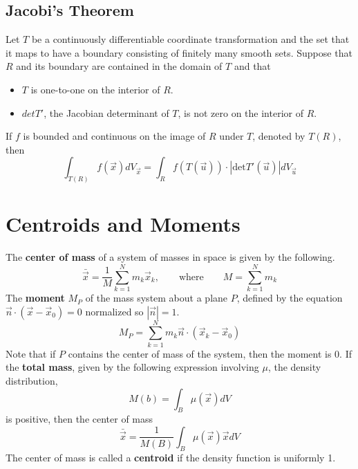 \documentclass[11pt]{article}
\begin{document}
		\subsection{Jacobi's Theorem}
			Let $T$ be a continuously differentiable coordinate transformation and the set that it maps to have a boundary consisting of finitely many smooth sets. Suppose that $R$ and its boundary are contained in the domain of $T$ and that
			\begin{itemize}
				\item $T$ is one-to-one on the interior of $R$.
				\item $det T'$, the Jacobian determinant of $T$, is not zero on the interior of $R$.
			\end{itemize}
			If $f$ is bounded and continuous on the image of $R$ under $T$, denoted by $T(R)$, then
			\begin{equation}
				\int_{T(R)} f(\vec{x})dV_{\vec{x}} = \int_R f(T(\vec{u}))\cdot|\text{det}T'(\vec{u})|dV_{\vec{u}}
			\end{equation}
			
\section{Centroids and Moments}
	The \textbf{center of mass} of a system of masses in space is given by the following.
	\begin{equation}
		\bar{\vec{x}} = \frac{1}{M}\sum_{k=1}^N m_k\vec{x}_k, \qquad \text{where} \qquad M=\sum_{k=1}^N m_k
	\end{equation}
	The \textbf{moment} $M_P$ of the mass system about a plane $P$, defined by the equation $\vec{n} \cdot (\vec{x} - \vec{x}_0) = 0$ normalized so $|\vec{n}| = 1$.
	\begin{equation}
		M_P = \sum_{k=1}^N m_k\vec{n} \cdot (\vec{x}_k - \vec{x}_0)
	\end{equation}
	Note that if $P$ contains the center of mass of the system, then the moment is 0. If the \textbf{total mass}, given by the following expression involving $\mu$, the density distribution,
	\begin{equation}
		M(b) = \int_B \mu(\vec{x})dV
	\end{equation}
	is positive, then the center of mass
	\begin{equation}
		\bar{\vec{x}} = \frac{1}{M(B)} \int_B \mu(\vec{x})\vec{x}dV
	\end{equation}
	The center of mass is called a  \textbf{centroid} if the density function is uniformly 1. 
	
\end{document}
